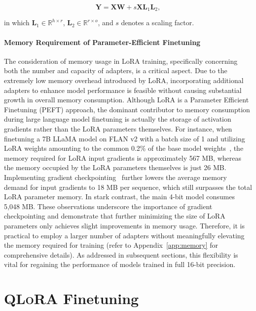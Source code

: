 \begin{equation}
    \mathbf{Y} = \mathbf{X}\mathbf{W} + s\mathbf{X}\mathbf{L}_1\mathbf{L}_2,
\end{equation}

in which $\mathbf{L}_1\in  \mathbb{R}^{h\times r}$, $\mathbf{L}_2\in  \mathbb{R}^{r\times o}$, and $s$ denotes a scaling factor.

\paragraph{Memory Requirement of Parameter-Efficient Finetuning} The consideration of memory usage in LoRA training, specifically concerning both the number and capacity of adapters, is a critical aspect. Due to the extremely low memory overhead introduced by LoRA, incorporating additional adapters to enhance model performance is feasible without causing substantial growth in overall memory consumption. Although LoRA is a Parameter Efficient Finetuning (PEFT) approach, the dominant contributor to memory consumption during large language model finetuning is actually the storage of activation gradients rather than the LoRA parameters themselves. For instance, when finetuning a 7B LLaMA model on FLAN v2 with a batch size of 1 and utilizing LoRA weights amounting to the common 0.2\% of the base model weights~\citep{hu2021lora,liu2022few}, the memory required for LoRA input gradients is approximately 567 MB, whereas the memory occupied by the LoRA parameters themselves is just 26 MB. Implementing gradient checkpointing~\citep{chen2016training} further lowers the average memory demand for input gradients to 18 MB per sequence, which still surpasses the total LoRA parameter memory. In stark contrast, the main 4-bit model consumes 5,048 MB. These observations underscore the importance of gradient checkpointing and demonstrate that further minimizing the size of LoRA parameters only achieves slight improvements in memory usage. Therefore, it is practical to employ a larger number of adapters without meaningfully elevating the memory required for training (refer to Appendix~\ref{app:memory} for comprehensive details). As addressed in subsequent sections, this flexibility is vital for regaining the performance of models trained in full 16-bit precision.

\section{\textsc{QLoRA} Finetuning}


